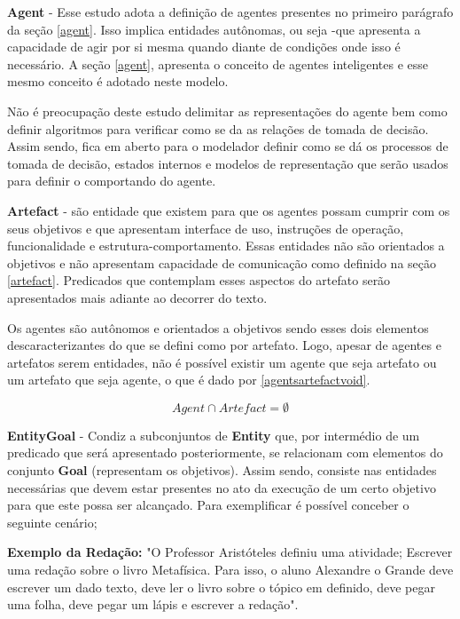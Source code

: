 \textbf{Agent} - Esse estudo adota a definição de agentes presentes no primeiro parágrafo da seção \ref{agent}. Isso implica entidades autônomas, ou seja -que apresenta a capacidade de agir por si mesma quando diante de condições onde isso é necessário. A seção \ref{agent}, apresenta o conceito de agentes inteligentes e esse mesmo conceito é adotado neste modelo. 

Não é preocupação deste estudo delimitar as representações do agente bem como definir algoritmos para verificar como se da as relações de tomada de decisão. Assim sendo, fica em aberto para o modelador definir como se dá os processos de tomada de decisão, estados internos e modelos de representação que serão usados para definir o comportando do agente. 

\textbf{Artefact} - são entidade que existem para que os agentes possam cumprir com os seus objetivos e que apresentam interface de uso, instruções de operação, funcionalidade e estrutura-comportamento. Essas entidades não são orientados a objetivos e 
não apresentam capacidade de comunicação como definido na seção \ref{artefact}. Predicados que contemplam esses aspectos do artefato serão apresentados mais adiante ao decorrer do texto. 

Os agentes são autônomos e orientados a objetivos sendo esses dois elementos descaracterizantes do que se defini como por artefato. Logo, apesar de agentes e artefatos serem entidades, não é possível existir um agente que seja artefato ou um artefato que seja agente, o que é dado por \ref{agentsartefactvoid}. 

\begin{equation} \label{agentsartefactvoid}
    Agent \cap Artefact = \emptyset
\end{equation}


\textbf{EntityGoal} - Condiz a subconjuntos de \textbf{Entity} que, por intermédio de um predicado que será apresentado posteriormente, se relacionam com elementos do conjunto \textbf{Goal} (representam os objetivos). Assim sendo, consiste nas entidades necessárias que devem estar presentes no ato da execução de um certo objetivo para que este possa ser alcançado. Para exemplificar é possível conceber o seguinte cenário; 

\textbf{Exemplo da Redação:} "O Professor Aristóteles definiu uma atividade; Escrever uma redação sobre o livro Metafísica. Para isso, o aluno Alexandre o Grande deve escrever um dado texto, deve ler o livro sobre o tópico em definido, deve pegar uma folha, deve pegar um lápis e escrever a redação".  


